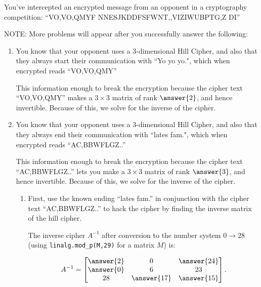 \documentclass{ximera}
\author{Zack Reed}
\begin{document}
\begin{problem}

   You've intercepted an encrypted message from an opponent in a cryptography competition: ``VO,VO,QMYF NNESJKDDFSFWNT,,VIZIWUBPTG,Z DI''
   
    NOTE: More problems will appear after you successfully answer the following:

    \begin{enumerate}
        \item You know that your opponent uses a 3-dimensional Hill Cipher, and also that they always start their communication with  ``Yo yo yo.", which when encrypted reads ``VO,VO,QMY''
        
        This information  enough to break the encryption because the cipher text ``VO,VO,QMY'' makes a $3\times 3$ matrix of rank $\answer{2}$, and hence  invertible. Because of this, we  solve for the inverse of the cipher. 


        \item You know that your opponent uses a 3-dimensional Hill Cipher, and also that they always end their communication with  ``lates fam.", which when encrypted reads ``AC,BBWFLGZ..''
        
        This information  enough to break the encryption because the cipher text ``AC,BBWFLGZ..'' lets you make a $3\times 3$ matrix of rank $\answer{3}$, and hence  invertible. Because of this, we  solve for the inverse of the cipher. 

        \begin{problem}

            \begin{enumerate}
                \item First, use the known ending ``lates fam.'' in conjunction with the cipher text ``AC,BBWFLGZ..'' to hack the cipher by finding the inverse matrix of the hill cipher. 
                
                The inverse cipher $A^{-1}$ after conversion to the number system $0\rightarrow 28$ (using \texttt{linalg.mod\_p(M,29)} for a matrix $M$) is:

                $$A^{-1}=\begin{bmatrix}
                    \answer{2} & 0 &\answer{24}\\
                    \answer{0} & 6 & 23 \\
                    28 & \answer{17} & \answer{15}
                \end{bmatrix}.$$


\end{enumerate}
\end{problem}
\end{enumerate}
\end{problem}
\end{document}
